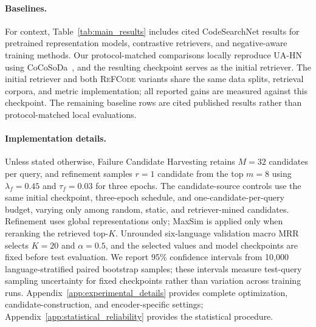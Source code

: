 \documentclass[11pt]{article}
\newcommand{\method}{\textsc{ReFCode}}
\begin{document}
\paragraph{Baselines.}
For context, Table~\ref{tab:main_results} includes cited CodeSearchNet results for pretrained representation models, contrastive retrievers, and negative-aware training methods. Our protocol-matched comparisons locally reproduce UA-HN using CoCoSoDa~\citep{CoCoSoDa,AAAIUA}, and the resulting checkpoint serves as the initial retriever. The initial retriever and both \method{} variants share the same data splits, retrieval corpora, and metric implementation; all reported gains are measured against this checkpoint. The remaining baseline rows are cited published results rather than protocol-matched local evaluations.

\paragraph{Implementation details.}
Unless stated otherwise, Failure Candidate Harvesting retains \(M=32\) candidates per query, and refinement samples \(r=1\) candidate from the top \(m=8\) using \(\lambda_f=0.45\) and \(\tau_f=0.03\) for three epochs. The candidate-source controls use the same initial checkpoint, three-epoch schedule, and one-candidate-per-query budget, varying only among random, static, and retriever-mined candidates. Refinement uses global representations only; MaxSim is applied only when reranking the retrieved top-\(K\). Unrounded six-language validation macro MRR selects \(K=20\) and \(\alpha=0.5\), and the selected values and model checkpoints are fixed before test evaluation. We report 95\% confidence intervals from 10,000 language-stratified paired bootstrap samples; these intervals measure test-query sampling uncertainty for fixed checkpoints rather than variation across training runs. Appendix~\ref{app:experimental_details} provides complete optimization, candidate-construction, and encoder-specific settings; Appendix~\ref{app:statistical_reliability} provides the statistical procedure.
\end{document}
